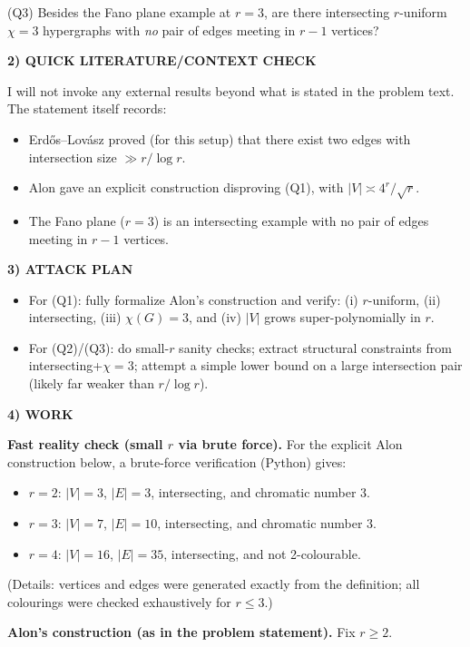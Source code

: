 (Q3) Besides the Fano plane example at $r=3$, are there intersecting $r$-uniform $\chi=3$ hypergraphs with \emph{no} pair of edges meeting in $r-1$ vertices?

\medskip
\noindent\textbf{2) QUICK LITERATURE/CONTEXT CHECK}

I will not invoke any external results beyond what is stated in the problem text.
The statement itself records:

\begin{itemize}
\item Erd\H{o}s--Lov\'{a}sz proved (for this setup) that there exist two edges with intersection size $\gg r/\log r$.
\item Alon gave an explicit construction disproving (Q1), with $|V|\asymp 4^r/\sqrt r$.
\item The Fano plane ($r=3$) is an intersecting example with no pair of edges meeting in $r-1$ vertices.
\end{itemize}

\medskip
\noindent\textbf{3) ATTACK PLAN}

\begin{itemize}
\item For (Q1): fully formalize Alon's construction and verify: (i) $r$-uniform, (ii) intersecting, (iii) $\chi(G)=3$, and (iv) $|V|$ grows super-polynomially in $r$.
\item For (Q2)/(Q3): do small-$r$ sanity checks; extract structural constraints from intersecting+$\chi=3$; attempt a simple lower bound on a large intersection pair (likely far weaker than $r/\log r$).
\end{itemize}

\medskip
\noindent\textbf{4) WORK}

\textbf{Fast reality check (small $r$ via brute force).}
For the explicit Alon construction below, a brute-force verification (Python) gives:
\begin{itemize}
\item $r=2$: $|V|=3$, $|E|=3$, intersecting, and chromatic number $3$.
\item $r=3$: $|V|=7$, $|E|=10$, intersecting, and chromatic number $3$.
\item $r=4$: $|V|=16$, $|E|=35$, intersecting, and not 2-colourable.
\end{itemize}
(Details: vertices and edges were generated exactly from the definition; all colourings were checked exhaustively for $r\le 3$.)

\medskip
\noindent\textbf{Alon's construction (as in the problem statement).}
Fix $r\ge 2$.

